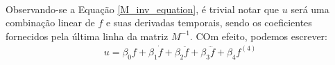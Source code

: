 \documentclass[a4paper,11pt]{scrartcl} %
\numberwithin{equation}{section} %
\numberwithin{figure}{section} %
\numberwithin{table}{section} %
\begin{document}
\paragraph{} Observando-se a Equação \ref{M_inv_equation}, é trivial notar que $u$ será uma combinação linear de $f$ e suas derivadas temporais, sendo os coeficientes fornecidos pela última linha da matriz $M^{-1}$. COm efeito, podemos escrever:
\begin{align}
	u = \beta_0 f + \beta_1 \dot{f} + \beta_2 \ddot{f} + \beta_3 \dddot{f} + \beta_4 f^{(4)}
\end{align}
\end{document}
